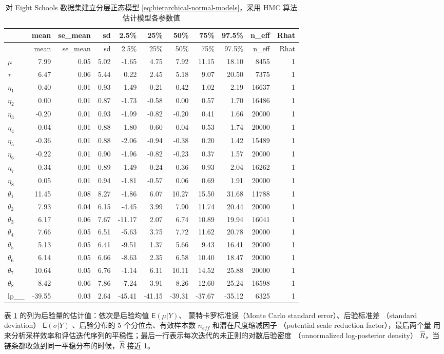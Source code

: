 \documentclass[12pt,a4paper,UTF8,twoside]{book}
\theoremstyle{definition}
\theoremstyle{definition}
\theoremstyle{definition}
\theoremstyle{remark}
\begin{document}
\begin{longtable}[]{@{}lrrrrrrrrrr@{}}
\caption{\label{tab:eight-schools-output} 对 Eight Schools
数据集建立分层正态模型 \eqref{eq:hierarchical-normal-models}，采用 HMC
算法估计模型各参数值}\tabularnewline
\toprule
& mean & se\_mean & sd & 2.5\% & 25\% & 50\% & 75\% & 97.5\% & n\_eff &
Rhat\tabularnewline
\midrule
\endfirsthead
\toprule
& mean & se\_mean & sd & 2.5\% & 25\% & 50\% & 75\% & 97.5\% & n\_eff &
Rhat\tabularnewline
\midrule
\endhead
\(\mu\) & 7.99 & 0.05 & 5.02 & -1.65 & 4.75 & 7.92 & 11.15 & 18.10 &
8455 & 1\tabularnewline
\(\tau\) & 6.47 & 0.06 & 5.44 & 0.22 & 2.45 & 5.18 & 9.07 & 20.50 & 7375
& 1\tabularnewline
\(\eta_1\) & 0.40 & 0.01 & 0.93 & -1.49 & -0.21 & 0.42 & 1.02 & 2.19 &
16637 & 1\tabularnewline
\(\eta_2\) & 0.00 & 0.01 & 0.87 & -1.73 & -0.58 & 0.00 & 0.57 & 1.70 &
16486 & 1\tabularnewline
\(\eta_3\) & -0.20 & 0.01 & 0.93 & -1.99 & -0.82 & -0.20 & 0.41 & 1.66 &
20000 & 1\tabularnewline
\(\eta_4\) & -0.04 & 0.01 & 0.88 & -1.80 & -0.60 & -0.04 & 0.53 & 1.74 &
20000 & 1\tabularnewline
\(\eta_5\) & -0.36 & 0.01 & 0.88 & -2.06 & -0.94 & -0.38 & 0.20 & 1.42 &
15489 & 1\tabularnewline
\(\eta_6\) & -0.22 & 0.01 & 0.90 & -1.96 & -0.82 & -0.23 & 0.37 & 1.57 &
20000 & 1\tabularnewline
\(\eta_7\) & 0.34 & 0.01 & 0.89 & -1.49 & -0.24 & 0.36 & 0.93 & 2.04 &
16262 & 1\tabularnewline
\(\eta_8\) & 0.05 & 0.01 & 0.94 & -1.81 & -0.57 & 0.06 & 0.69 & 1.91 &
20000 & 1\tabularnewline
\(\theta_1\) & 11.45 & 0.08 & 8.27 & -1.86 & 6.07 & 10.27 & 15.50 &
31.68 & 11788 & 1\tabularnewline
\(\theta_2\) & 7.93 & 0.04 & 6.15 & -4.45 & 3.99 & 7.90 & 11.74 & 20.44
& 20000 & 1\tabularnewline
\(\theta_3\) & 6.17 & 0.06 & 7.67 & -11.17 & 2.07 & 6.74 & 10.89 & 19.94
& 16041 & 1\tabularnewline
\(\theta_4\) & 7.66 & 0.05 & 6.51 & -5.63 & 3.75 & 7.72 & 11.62 & 20.78
& 20000 & 1\tabularnewline
\(\theta_5\) & 5.13 & 0.05 & 6.41 & -9.51 & 1.37 & 5.66 & 9.43 & 16.41 &
20000 & 1\tabularnewline
\(\theta_6\) & 6.14 & 0.05 & 6.66 & -8.63 & 2.35 & 6.58 & 10.40 & 18.47
& 20000 & 1\tabularnewline
\(\theta_7\) & 10.64 & 0.05 & 6.76 & -1.14 & 6.11 & 10.11 & 14.52 &
25.88 & 20000 & 1\tabularnewline
\(\theta_8\) & 8.42 & 0.06 & 7.86 & -7.24 & 3.91 & 8.26 & 12.60 & 25.24
& 16598 & 1\tabularnewline
lp\_\_ & -39.55 & 0.03 & 2.64 & -45.41 & -41.15 & -39.31 & -37.67 &
-35.12 & 6325 & 1\tabularnewline
\bottomrule
\end{longtable}

表 \ref{tab:eight-schools-output} 的列为后验量的估计值：依次是后验均值
\(\mathsf{E}(\mu|Y)\)、 蒙特卡罗标准误（Monte Carlo standard
error）、后验标准差 （standard deviation） \(\mathsf{E}(\sigma|Y)\)
、后验分布的 5 个分位点、有效样本数 \(n_{eff}\) 和潜在尺度缩减因子
（potential scale reduction factor），最后两个量
用来分析采样效率和评估迭代序列的平稳性；最后一行表示每次迭代的未正则的对数后验密度
（unnormalized log-posterior density）
\(\hat{R}\)，当链条都收敛到同一平稳分布的时候，\(\hat{R}\) 接近 1。
\end{document}
